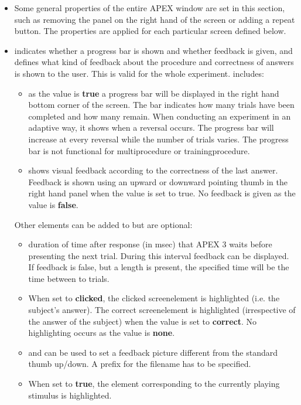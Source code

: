 \begin{itemize}
\item {} Some general properties of the entire APEX window are set in this section, such as removing the panel on the right hand of the screen or adding a repeat button. The properties are applied for each particular screen defined below. 
\item {} indicates whether a progress bar is
shown and whether feedback is given, and defines what kind of feedback about the procedure and correctness of answers is shown to the user. This is valid for the whole experiment.
 includes: 

\begin{itemize}
\item {} as the value is \textbf{true} a progress bar will be displayed in the right hand bottom corner of the screen. The bar indicates how many trials have been completed and how many remain. When conducting an experiment in an adaptive way, it shows when a reversal occurs. The progress bar will increase at every reversal while the number of trials varies. The progress bar is not functional for multiprocedure or trainingprocedure.
\item {} shows visual feedback according to the correctness of the last answer. Feedback is shown using an upward or downward pointing thumb in the right hand panel when the value is set to true. No feedback is given as the value is \textbf{false}. 
\end{itemize}

Other elements can be added to  but are optional:
\begin{itemize}
\item {} duration of time after response (in msec) that APEX 3 waits before presenting the next trial. During this interval feedback can be displayed. If feedback is false, but a length is present, the specified time will be the time between to trials.
\item {} When set to \textbf{clicked}, the clicked screenelement is highlighted (i.e. the subject’s answer). The correct screenelement is highlighted (irrespective of the answer of the subject) when the value is set to \textbf{correct}. No highlighting occurs as the value is \textbf{none}. 
\item {} and  can be used to set a feedback picture different from the standard thumb up/down. A prefix for the filename has to be specified. 
\item {} When set to \textbf{true}, the element corresponding to the currently playing stimulus is highlighted. 
\end{itemize}


\end{itemize}
